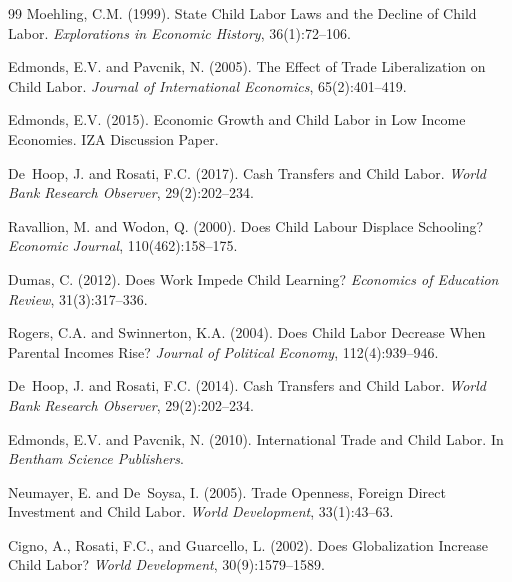 \documentclass[12pt]{article}
\begin{document}
\begin{thebibliography}{99}
Moehling, C.M. (1999).
\newblock State Child Labor Laws and the Decline of Child Labor.
\newblock \textit{Explorations in Economic History}, 36(1):72--106.

Edmonds, E.V. and Pavcnik, N. (2005).
\newblock The Effect of Trade Liberalization on Child Labor.
\newblock \textit{Journal of International Economics}, 65(2):401--419.

Edmonds, E.V. (2015).
\newblock Economic Growth and Child Labor in Low Income Economies.
\newblock IZA Discussion Paper.

De~Hoop, J. and Rosati, F.C. (2017).
\newblock Cash Transfers and Child Labor.
\newblock \textit{World Bank Research Observer}, 29(2):202--234.

Ravallion, M. and Wodon, Q. (2000).
\newblock Does Child Labour Displace Schooling?
\newblock \textit{Economic Journal}, 110(462):158--175.

Dumas, C. (2012).
\newblock Does Work Impede Child Learning?
\newblock \textit{Economics of Education Review}, 31(3):317--336.

Rogers, C.A. and Swinnerton, K.A. (2004).
\newblock Does Child Labor Decrease When Parental Incomes Rise?
\newblock \textit{Journal of Political Economy}, 112(4):939--946.

De~Hoop, J. and Rosati, F.C. (2014).
\newblock Cash Transfers and Child Labor.
\newblock \textit{World Bank Research Observer}, 29(2):202--234.

Edmonds, E.V. and Pavcnik, N. (2010).
\newblock International Trade and Child Labor.
\newblock In \textit{Bentham Science Publishers}.

Neumayer, E. and De~Soysa, I. (2005).
\newblock Trade Openness, Foreign Direct Investment and Child Labor.
\newblock \textit{World Development}, 33(1):43--63.

Cigno, A., Rosati, F.C., and Guarcello, L. (2002).
\newblock Does Globalization Increase Child Labor?
\newblock \textit{World Development}, 30(9):1579--1589.


\end{thebibliography}
\end{document}
